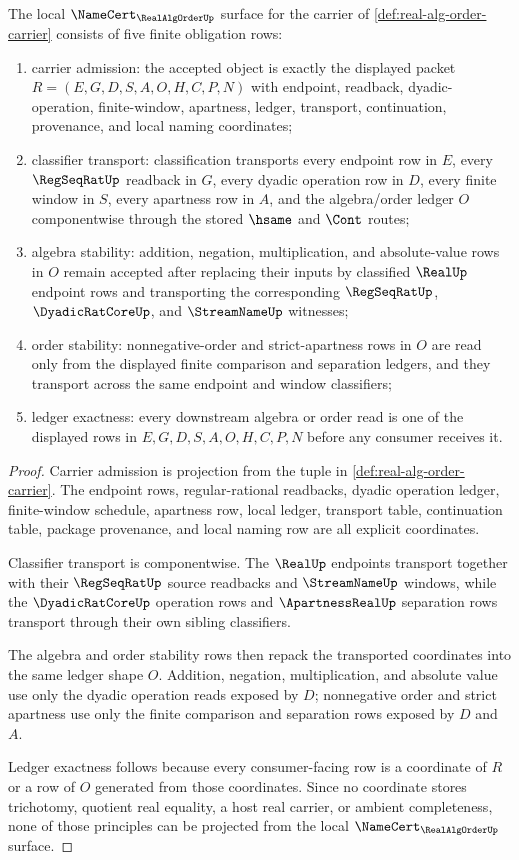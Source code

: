 \begin{theorem}
\label{thm:real-alg-order-namecert-obligations}
The local $\NameCert_{\RealAlgOrderUp}$ surface for the carrier of \autoref{def:real-alg-order-carrier} consists of five finite obligation rows:
\begin{enumerate}
\item carrier admission: the accepted object is exactly the displayed packet $R=(E,G,D,S,A,O,H,C,P,N)$ with endpoint, readback, dyadic-operation, finite-window, apartness, ledger, transport, continuation, provenance, and local naming coordinates;
\item classifier transport: classification transports every endpoint row in $E$, every $\RegSeqRatUp$ readback in $G$, every dyadic operation row in $D$, every finite window in $S$, every apartness row in $A$, and the algebra/order ledger $O$ componentwise through the stored $\hsame$ and $\Cont$ routes;
\item algebra stability: addition, negation, multiplication, and absolute-value rows in $O$ remain accepted after replacing their inputs by classified $\RealUp$ endpoint rows and transporting the corresponding $\RegSeqRatUp$, $\DyadicRatCoreUp$, and $\StreamNameUp$ witnesses;
\item order stability: nonnegative-order and strict-apartness rows in $O$ are read only from the displayed finite comparison and separation ledgers, and they transport across the same endpoint and window classifiers;
\item ledger exactness: every downstream algebra or order read is one of the displayed rows in $E,G,D,S,A,O,H,C,P,N$ before any consumer receives it.
\end{enumerate}
\end{theorem}
\begin{proof}
Carrier admission is projection from the tuple in \autoref{def:real-alg-order-carrier}. The endpoint rows, regular-rational readbacks, dyadic operation ledger, finite-window schedule, apartness row, local ledger, transport table, continuation table, package provenance, and local naming row are all explicit coordinates.

Classifier transport is componentwise. The $\RealUp$ endpoints transport together with their $\RegSeqRatUp$ source readbacks and $\StreamNameUp$ windows, while the $\DyadicRatCoreUp$ operation rows and $\ApartnessRealUp$ separation rows transport through their own sibling classifiers.

The algebra and order stability rows then repack the transported coordinates into the same ledger shape $O$. Addition, negation, multiplication, and absolute value use only the dyadic operation reads exposed by $D$; nonnegative order and strict apartness use only the finite comparison and separation rows exposed by $D$ and $A$.

Ledger exactness follows because every consumer-facing row is a coordinate of $R$ or a row of $O$ generated from those coordinates. Since no coordinate stores trichotomy, quotient real equality, a host real carrier, or ambient completeness, none of those principles can be projected from the local $\NameCert_{\RealAlgOrderUp}$ surface.
\end{proof}

